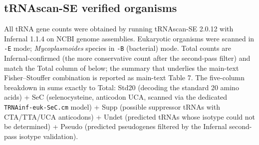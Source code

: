 \documentclass[preprint,11pt,authoryear,a4paper]{elsarticle}
\begin{document}
\protect{}\label{tbl:s-trna-provenance}{}

\subsection{tRNAscan-SE verified organisms}

All tRNA gene counts were obtained by running tRNAscan-SE 2.0.12
\citep{chan2019} with Infernal 1.1.4 on NCBI genome assemblies.
Eukaryotic organisms were scanned in \texttt{-E} mode;
\emph{Mycoplasmoides} species in \texttt{-B} (bacterial) mode. Total
counts are Infernal-confirmed (the more conservative count after the
second-pass filter) and match the Total column of 
below; the summary that underlies the main-text Fisher--Stouffer
combination is reported as main-text Table 7. The five-column breakdown
in  sums exactly to Total: Std20 (decoding the
standard 20 amino acids) + SeC (selenocysteine, anticodon UCA, scanned
via the dedicated \texttt{TRNAinf-euk-SeC.cm} model) + Supp (possible
suppressor tRNAs with CTA/TTA/UCA anticodons) + Undet (predicted tRNAs
whose isotype could not be determined) + Pseudo (predicted pseudogenes
filtered by the Infernal second-pass isotype validation).
\end{document}

